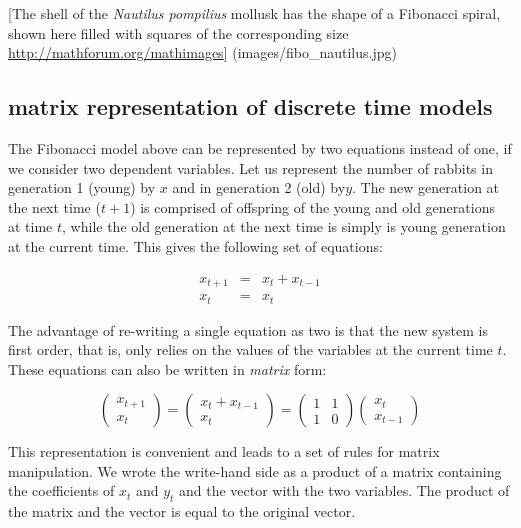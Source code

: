 \documentclass[
  letterpaper,
  DIV=11,
  numbers=noendperiod]{scrreprt}
\begin{document}
{[}The shell of the \emph{Nautilus pompilius} mollusk has the shape of a
Fibonacci spiral, shown here filled with squares of the corresponding
size \url{http://mathforum.org/mathimages}{]}
(images/fibo\_nautilus.jpg)

\hypertarget{matrix-representation-of-discrete-time-models}{%
\subsection{matrix representation of discrete time
models}\label{matrix-representation-of-discrete-time-models}}

The Fibonacci model above can be represented by two equations instead of
one, if we consider two dependent variables. Let us represent the number
of rabbits in generation 1 (young) by \(x\) and in generation 2 (old)
by\(y\). The new generation at the next time (\(t+1\)) is comprised of
offspring of the young and old generations at time \(t\), while the old
generation at the next time is simply is young generation at the current
time. This gives the following set of equations:

\[\begin{aligned}
 x_{t+1} & = & x_t + x_{t-1}\\
 x_{t} & = & x_t\end{aligned}
\]

The advantage of re-writing a single equation as two is that the new
system is first order, that is, only relies on the values of the
variables at the current time \(t\). These equations can also be written
in \emph{matrix} form:

\[
\left(\begin{array}{c}x_{t+1} \\x_{t}\end{array}\right) = \left(\begin{array}{c}x_t + x_{t-1} \\x_ t \end{array}\right) =   \left(\begin{array}{cc}1 & 1\\1 & 0\end{array}\right) \left(\begin{array}{c}x_t \\ x_{t-1} \end{array}\right)
\]

This representation is convenient and leads to a set of rules for matrix
manipulation. We wrote the write-hand side as a product of a matrix
containing the coefficients of \(x_t\) and \(y_t\) and the vector with
the two variables. The product of the matrix and the vector is equal to
the original vector.
\end{document}
